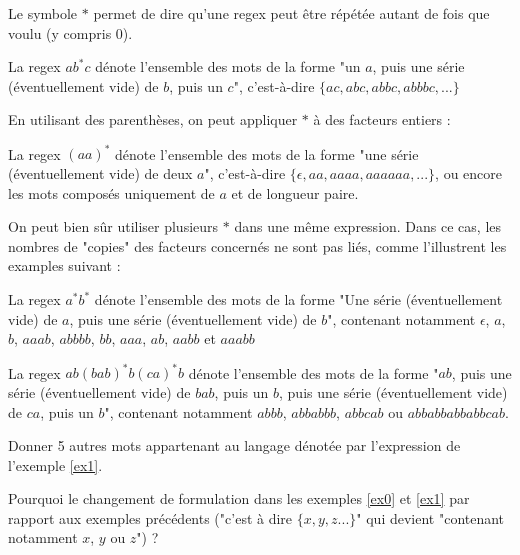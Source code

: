Le symbole $*$ permet de dire qu'une regex peut être répétée autant de fois que voulu (y compris 0). 

\begin{example}
La regex $ab^*c$ dénote l'ensemble des mots de la forme "un $a$, puis une série (éventuellement vide) de $b$, puis un $c$", c'est-à-dire $\{ac, abc, abbc, abbbc, ...\}$
\end{example}

En utilisant des parenthèses, on peut appliquer $*$ à des facteurs entiers :

\begin{example}
La regex $(aa)^*$ dénote l'ensemble des mots de la forme "une série (éventuellement vide) de deux $a$", c'est-à-dire $\{\epsilon, aa, aaaa, aaaaaa, ...\}$, ou encore les mots composés uniquement de $a$ et de longueur paire.
\end{example}

On peut bien sûr utiliser plusieurs $*$ dans une même expression. Dans ce cas, les nombres de "copies" des facteurs concernés ne sont pas liés, comme l'illustrent les examples suivant :


\begin{example}
\label{ex0}
La regex $a^*b^*$ dénote l'ensemble des mots de la forme "Une série (éventuellement vide) de $a$, puis une série (éventuellement vide) de $b$", contenant notamment $\epsilon$, $a$, $b$, $aaab$, $abbbb$, $bb$, $aaa$, $ab$, $aabb$ et $aaabb$
\end{example}

\begin{example}
\label{ex1}
La regex $ab(bab)^*b(ca)^*b$ dénote l'ensemble des mots de la forme "$ab$, puis une série (éventuellement vide) de $bab$, puis un $b$, puis une série (éventuellement vide) de $ca$, puis un $b$", contenant notamment $abbb$, $abbabbb$, $abbcab$ ou $abbabbabbabbcab$.
\end{example}

\begin{exercice}
Donner 5 autres mots appartenant au langage dénotée par l'expression de l'exemple \ref{ex1}. 
\end{exercice}

\begin{exercice}
Pourquoi le changement de formulation dans les exemples \ref{ex0} et \ref{ex1} par rapport aux exemples précédents ("c'est à dire $\{x, y, z ... \}$" qui devient "contenant notamment $x$, $y$ ou $z$") ?
\end{exercice}

